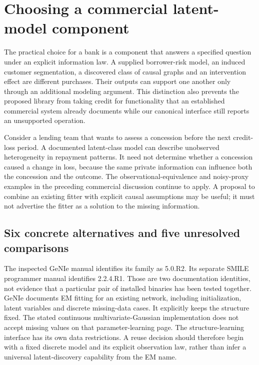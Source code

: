 \hypertarget{choosing-a-commercial-latent-model-component}{%
\section{Choosing a commercial latent-model
component}\label{choosing-a-commercial-latent-model-component}}

\label{exec14:commercial-latent-choice}

The practical choice for a bank is a component that answers a specified
question under an explicit information law. A supplied borrower-risk
model, an induced customer segmentation, a discovered class of causal
graphs and an intervention effect are different purchases. Their outputs
can support one another only through an additional modeling argument.
This distinction also prevents the proposed library from taking credit
for functionality that an established commercial system already
documents while our canonical interface still reports an unsupported
operation.

Consider a lending team that wants to assess a concession before the
next credit-loss period. A documented latent-class model can describe
unobserved heterogeneity in repayment patterns. It need not determine
whether a concession caused a change in loss, because the same private
information can influence both the concession and the outcome. The
observational-equivalence and noisy-proxy examples in the preceding
commercial discussion continue to apply. A proposal to combine an
existing fitter with explicit causal assumptions may be useful; it must
not advertise the fitter as a solution to the missing information.

\hypertarget{six-concrete-alternatives-and-five-unresolved-comparisons}{%
\subsection{Six concrete alternatives and five unresolved
comparisons}\label{six-concrete-alternatives-and-five-unresolved-comparisons}}

The inspected GeNIe manual identifies its family as 5.0.R2. Its separate
SMILE programmer manual identifies 2.2.4.R1. Those are two documentation
identities, not evidence that a particular pair of installed binaries
has been tested together. GeNIe documents EM fitting for an existing
network, including initialization, latent variables and discrete
missing-data cases. It explicitly keeps the structure fixed. The stated
continuous multivariate-Gaussian implementation does not accept missing
values on that parameter-learning page. The structure-learning interface
has its own data restrictions. A reuse decision should therefore begin
with a fixed discrete model and its explicit observation law, rather
than infer a universal latent-discovery capability from the EM name.
\citep{exec13_genie_readme,exec13_smile_intro,exec13_latent_genie_structure,exec13_latent_genie_parameters}

